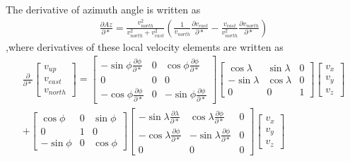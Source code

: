 \documentclass[11pt]{article}
\begin{document}
\noindent The derivative of azimuth angle is written as
\begin{equation}
	\label{eq:velocity_Az_deriv}
	\begin{aligned}
		\frac{\partial Az}{\partial *} = \frac{v_{north}^2}{v_{north}^2 + v_{east}^2}
		\left(
		\frac{1}{v_{north}} \frac{\partial v_{east}}{\partial *} - \frac{v_{east}}{v_{north}^2} \frac{\partial v_{north}}{\partial *}
		\right)
	\end{aligned}
\end{equation}
,where derivatives of these local velocity elements are written as
\begin{equation}
	\label{eq:velocity_local_deriv}
	\begin{aligned}
	\frac{\partial}{\partial *}
		\begin{bmatrix}
		v_{up}\\
		v_{east}\\
		v_{north}
		\end{bmatrix} =
		\begin{bmatrix}
		-\sin{\phi}\frac{\partial \phi}{\partial *} & 0 & \cos{\phi}\frac{\partial \phi}{\partial *}\\
		0 & 0 & 0\\
		-\cos{\phi}\frac{\partial \phi}{\partial *} & 0 & -\sin{\phi}\frac{\partial \phi}{\partial *}
		\end{bmatrix}
		\begin{bmatrix}
		\cos{\lambda} & \sin{\lambda} & 0\\
		-\sin{\lambda}& \cos{\lambda} & 0\\
		0 & 0 & 1
		\end{bmatrix}
		\begin{bmatrix}
		v_{x}\\
		v_{y}\\
		v_{z}
		\end{bmatrix} \\
		+
		\begin{bmatrix}
		\cos{\phi} & 0 & \sin{\phi}\\
		0 & 1 & 0\\
		-\sin{\phi} & 0 & \cos{\phi}
		\end{bmatrix}
		\begin{bmatrix}
		-\sin{\lambda}\frac{\partial \lambda}{\partial *} & \cos{\lambda}\frac{\partial \phi}{\partial *} & 0\\
		-\cos{\lambda}\frac{\partial \phi}{\partial *}& -\sin{\lambda}\frac{\partial \phi}{\partial *} & 0\\
		0 & 0 & 0
		\end{bmatrix}
		\begin{bmatrix}
		v_{x}\\
		v_{y}\\
		v_{z}
		\end{bmatrix}
	\end{aligned}
\end{equation}
\end{document}
